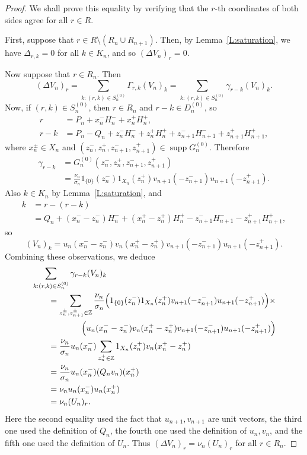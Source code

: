 \documentclass[10pt,a4paper]{amsart}
\newcommand{\ZZ}{\mathbb{Z}}
\DeclareMathOperator{\supp}{supp}
\begin{document}
\begin{proof}
We shall prove this equality by verifying that the
$r$-th coordinates of both sides agree for all $r\in R$.

First, suppose that $r\in R\setminus(R_n\cup R_{n+1})$. 
Then, by Lemma~\ref{L:saturation}, we have $\Delta_{r,k}=0$ for all $k\in K_n$, and so $(\Delta V_n)_r=0$.


Now suppose that $r\in R_n$. Then
\[
(\Delta V_n)_r
=\sum_{k:(r,k)\in S_n^{(0)}}\Gamma_{r,k}(V_n)_k
=\sum_{k:(r,k)\in S_n^{(0)}}\gamma_{r-k} (V_n)_k.
\]
Now, if $(r,k)\in S_n^{(0)}$, then $r\in R_n$ and $r-k\in D_n^{(0)}$, so
\begin{align*}
r&=P_n+x_n^{-}H_n^-+x_n^+H_n^+,\\
r-k&=P_n-Q_n+z_n^-H_n^-+z_n^+H_n^++z_{n+1}^-H_{n+1}^-+z_{n+1}^+H_{n+1}^+,
\end{align*}
where $x_n^\pm\in X_n$ and $(z_n^-,z_n^+,z_{n+1}^-,z_{n+1}^+)\in\supp G_n^{(0)}$.
Therefore
\begin{align*}
\gamma_{r-k}
&=G_n^{(0)}(z_n^-,z_n^+,z_{n+1}^-,z_{n+1}^+)\\
&=\frac{\nu_n}{\sigma_n}1_{\{0\}}(z_n^-)1_{X_n}(z_n^+)v_{n+1}(-z_{n+1}^-)u_{n+1}(-z_{n+1}^+).
\end{align*}
Also $k\in K_n$ by Lemma~\ref{L:saturation}, and
\begin{align*}
k&=r-(r-k)\\
&=Q_n+(x_n^--z_n^-)H_n^-+(x_n^+-z_n^+)H_n^+-z_{n+1}^-H_{n+1}^--z_{n+1}^+H_{n+1}^+,
\end{align*}
so
\[ 
(V_n)_{k}=u_n(x_n^--z_n^-)v_n(x_n^+-z_n^+)v_{n+1}(-z_{n+1}^-)u_{n+1}(-z_{n+1}^+).
\]
Combining these observations, we deduce
\begin{align*}
&\sum_{k:(r,k)\in S_n^{(0)}}\gamma_{r-k} (V_n)_k\\
&\qquad=\sum_{z_n^\pm,z_{n+1}^\pm\in\ZZ}\frac{\nu_n}{\sigma_n}\Bigl(1_{\{0\}}(z_n^-)1_{X_n}(z_n^+)v_{n+1}(-z_{n+1}^-)u_{n+1}(-z_{n+1}^+)\Bigr)\times\\
&\qquad\qquad\qquad\Bigl(u_n(x_n^--z_n^-)v_n(x_n^+-z_n^+)v_{n+1}(-z_{n+1}^-)u_{n+1}(-z_{n+1}^+)\Bigr)\\
&\qquad=\frac{\nu_n}{\sigma_n}u_n(x_n^-)\sum_{z_n^+\in\ZZ}1_{X_n}(z_n^+)v_n(x_n^+-z_n^+)\\
&\qquad=\frac{\nu_n}{\sigma_n}u_n(x_n^-)(Q_nv_n)(x_n^+)\\
&\qquad=\nu_nu_n(x_n^-)u_n(x_n^+)\\
&\qquad=\nu_n(U_n)_r.
\end{align*}
Here
the second equality used the fact that $u_{n+1},v_{n+1}$ are unit vectors,
the third one used the definition of $Q_n$, the fourth one
used the definition of $u_n,v_n$, and the fifth one used the definition of $U_n$.
Thus $(\Delta V_n)_r=\nu_n(U_n)_r$ for all 
$r\in R_n$.


\end{proof}
\end{document}
